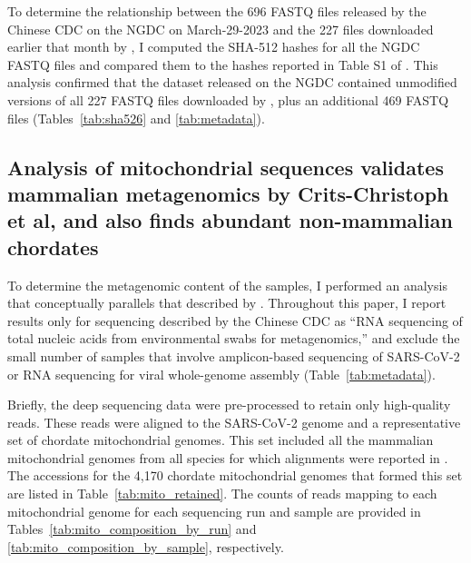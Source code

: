 \documentclass[9pt,twocolumn,twoside]{gsajnl_modified}
\begin{document}
To determine the relationship between the 696 FASTQ files released by the Chinese CDC on the NGDC on March-29-2023 and the 227 files downloaded earlier that month by \citet{crits2023genetic}, I computed the SHA-512 hashes for all the NGDC FASTQ files and compared them to the hashes reported in Table S1 of \citet{crits2023genetic}.
This analysis confirmed that the dataset released on the NGDC contained unmodified versions of all 227 FASTQ files downloaded by \citet{crits2023genetic}, plus an additional 469 FASTQ files (Tables~\ref{tab:sha526} and \ref{tab:metadata}).

\subsection{Analysis of mitochondrial sequences validates mammalian metagenomics by Crits-Christoph et al, and also finds abundant non-mammalian chordates}
To determine the metagenomic content of the samples, I performed an analysis that conceptually parallels that described by \citet{crits2023genetic}.
Throughout this paper, I report results only for sequencing described by the Chinese CDC as ``RNA sequencing of total nucleic acids from environmental swabs for metagenomics,'' and exclude the small number of samples that involve amplicon-based sequencing of SARS-CoV-2 or RNA sequencing for viral whole-genome assembly (Table~\ref{tab:metadata}).

Briefly, the deep sequencing data were pre-processed to retain only high-quality reads.
These reads were aligned to the SARS-CoV-2 genome and a representative set of chordate mitochondrial genomes.
This set included all the mammalian mitochondrial genomes from all species for which alignments were reported in \citet{crits2023genetic}.
The accessions for the 4,170 chordate mitochondrial genomes that formed this set are listed in Table~\ref{tab:mito_retained}.
The counts of reads mapping to each mitochondrial genome for each sequencing run and sample are provided in Tables~\ref{tab:mito_composition_by_run} and \ref{tab:mito_composition_by_sample}, respectively.
\end{document}
